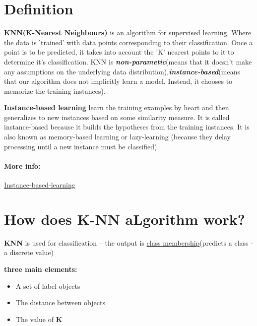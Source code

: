 \documentclass[12 pt]{article}        	%
\begin{document}

\section*{Definition}
\textbf{KNN(K-Nearest Neighbours)} is an algorithm for supervised learning. Where the data is 'trained' with data points corresponding to their classification. Once a point is to be predicted, it takes into account the 'K' nearest points to it to determine it's classification.
KNN is \textbf{\textit{non-parametic}}(means that it doesn't make any assumptions on the underlying data distribution),\textbf{\textit{instance-based}}(means that our algorithm does not implicitly learn a model. Instead, it chooses to memorize the training instances).

\textbf{Instance-based learning} learn the training examples by heart and then generalizes to new instances based on some similarity measure. It is called instance-based because it builds the hypotheses from the training instances. It is also known as memory-based learning or lazy-learning (because they delay processing until a new instance must be classified)
\paragraph*{More info:} \href{https://www.geeksforgeeks.org/instance-based-learning/}{Instance-based-learning}

\section*{How does K-NN aLgorithm work? }
\textbf{KNN} is used for classification -- the output is \underline{class membership}(predicts a class - a discrete value)
\par
\textbf{three main elements:}
\begin{itemize}
	\item A set of label objects
	\item The distance between objects
	\item The value of \textbf{K}
  \end{itemize}

  
\end{document}
